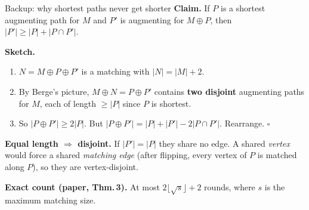 \documentclass[aspectratio=169,11pt]{beamer}
\begin{document}
\appendix
\begin{frame}{Backup: why shortest paths never get shorter}
\textbf{Claim.} If $P$ is a shortest augmenting path for $M$ and $P'$ is augmenting for $M\oplus P$, then $|P'|\ge|P|+|P\cap P'|$.
\vspace{2mm}

\textbf{Sketch.}
\begin{enumerate}\setlength\itemsep{3pt}
  \item $N=M\oplus P\oplus P'$ is a matching with $|N|=|M|+2$.
  \item By Berge's picture, $M\oplus N=P\oplus P'$ contains \textbf{two disjoint} augmenting paths for $M$, each of length $\ge|P|$ since $P$ is shortest.
  \item So $|P\oplus P'|\ge2|P|$. But $|P\oplus P'|=|P|+|P'|-2|P\cap P'|$. Rearrange. $\square$
\end{enumerate}
\vspace{2mm}
\textbf{Equal length $\Rightarrow$ disjoint.} If $|P'|=|P|$ they share no edge. A shared \emph{vertex} would force a shared \emph{matching edge} (after flipping, every vertex of $P$ is matched along $P$), so they are vertex-disjoint.
\vspace{2mm}

\textbf{Exact count (paper, Thm.\,3).} At most $2\lfloor\sqrt s\rfloor+2$ rounds, where $s$ is the maximum matching size.
\end{frame}
\end{document}
